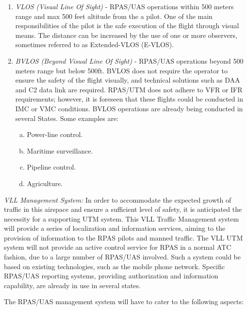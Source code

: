 \begin{enumerate}
    \item \emph{VLOS (Visual Line Of Sight)} - RPAS/UAS operations within 500 meters range and max 500 feet  altitude from the a pilot. One of the main responsibilities of the pilot is the safe execution of the flight through visual means. The distance can be increased by the use of one or more observers, sometimes referred to as Extended-VLOS (E-VLOS).
    
    \item \emph{BVLOS (Beyond Visual Line Of Sight)} -  RPAS/UAS operations beyond 500 meters range but below 500ft. BVLOS does not require the operator to ensure the safety of the flight visually, and technical solutions such as DAA and C2 data link are required. RPAS/UTM does not adhere to VFR or IFR requirements; however, it is foreseen that these flights could be conducted in IMC or VMC conditions. BVLOS operations are already being conducted in several States. Some examples are:
    
    \begin{enumerate}[a.]
        \item Power-line control.
        
        \item Maritime surveillance.
        
        \item Pipeline control.
        
        \item  Agriculture.
    \end{enumerate}
\end{enumerate}

\noindent\emph{VLL Management System:} In order to accommodate the expected growth of traffic in this airspace and ensure a sufficient level of safety, it is anticipated the necessity for a supporting UTM system. This VLL Traffic Management system will provide a series of localization and information services, aiming to the provision of information to the RPAS pilots and manned traffic. The VLL UTM system will not provide an active control service for RPAS in a normal ATC fashion, due to a large number of RPAS/UAS involved. Such a system could be based on existing technologies, such as the mobile phone network. Specific RPAS/UAS reporting systems, providing authorization and information capability, are already in use in several states.

The RPAS/UAS management system will have to cater to the following aspects:

